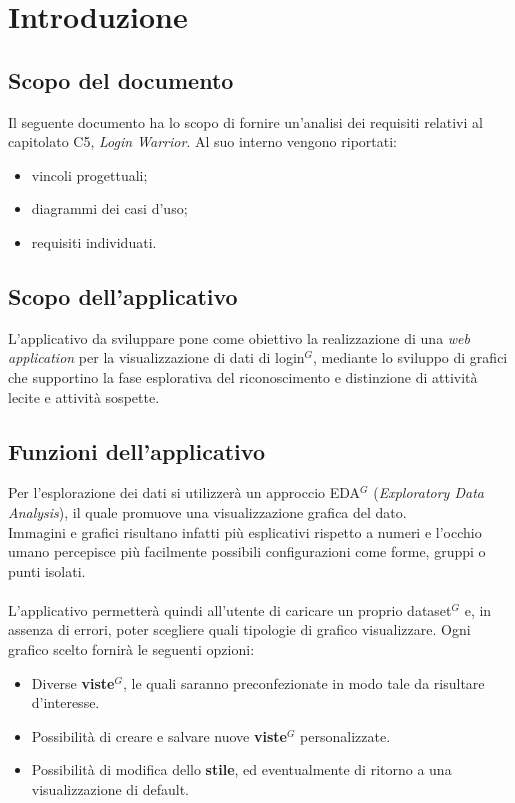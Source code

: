 \section{Introduzione}
\subsection{Scopo del documento}
Il seguente documento ha lo scopo di fornire un'analisi dei requisiti relativi al capitolato C5, \textit{Login Warrior}.
Al suo interno vengono riportati:
\begin{itemize}
    \item vincoli progettuali;
    \item diagrammi dei casi d'uso;
    \item requisiti individuati.
\end{itemize}

\subsection{Scopo dell'applicativo}

L'applicativo da sviluppare pone come obiettivo la realizzazione di una \textit{web application} per la visualizzazione di dati di login$^{G}$, mediante lo sviluppo di grafici che supportino la fase esplorativa del riconoscimento e distinzione di attività lecite e attività sospette.

\subsection{Funzioni dell'applicativo}

Per l'esplorazione dei dati si utilizzerà un approccio EDA$^{G}$ (\textit{Exploratory Data Analysis}), il quale promuove una visualizzazione grafica del dato.\\ 
Immagini e grafici risultano infatti più esplicativi rispetto a numeri e l'occhio umano percepisce più facilmente possibili configurazioni come forme, gruppi o punti isolati. \\ \\
L'applicativo permetterà quindi all'utente di caricare un proprio dataset$^{G}$ e, in assenza di errori, poter scegliere quali tipologie di grafico visualizzare. Ogni grafico scelto fornirà le seguenti opzioni:
\begin{itemize}
\item Diverse \textbf{viste$^{G}$}, le quali saranno preconfezionate in modo tale da risultare d'interesse.
\item Possibilità di creare e salvare nuove \textbf{viste$^{G}$} personalizzate.
\item Possibilità di modifica dello \textbf{stile}, ed eventualmente di ritorno a una visualizzazione di default.
\end{itemize}

